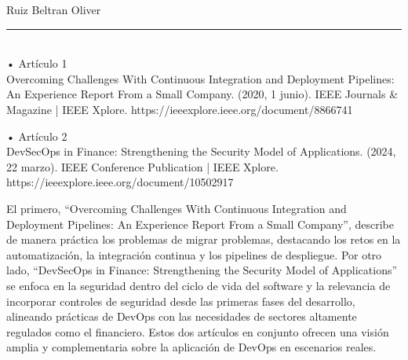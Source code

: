 \documentclass[12pt,a4paper]{article}
\begin{document}
\newpage
Ruiz Beltran Oliver \\
\rule{\linewidth}{0.3mm} \\
• Artículo 1 \\
Overcoming Challenges With Continuous Integration and Deployment Pipelines: An Experience Report From a Small Company. (2020, 1 junio). IEEE Journals \& Magazine | IEEE Xplore. https://ieeexplore.ieee.org/document/8866741


• Artículo 2 \\
DevSecOps in Finance: Strengthening the Security Model of Applications. (2024, 22 marzo). IEEE Conference Publication | IEEE Xplore. https://ieeexplore.ieee.org/document/10502917


El primero, “Overcoming Challenges With Continuous Integration and Deployment Pipelines: An Experience Report From a Small Company”, describe de manera práctica los problemas de migrar problemas, destacando los retos en la automatización, la integración continua y los pipelines de despliegue. Por otro lado, “DevSecOps in Finance: Strengthening the Security Model of Applications” se enfoca en la seguridad dentro del ciclo de vida del software y la relevancia de incorporar controles de seguridad desde las primeras fases del desarrollo, alineando prácticas de DevOps con las necesidades de sectores altamente regulados como el financiero.
Estos dos artículos en conjunto ofrecen una visión amplia y complementaria sobre la aplicación de DevOps en escenarios reales.

\vspace{1.5cm}
\printbibliography
\end{document}
